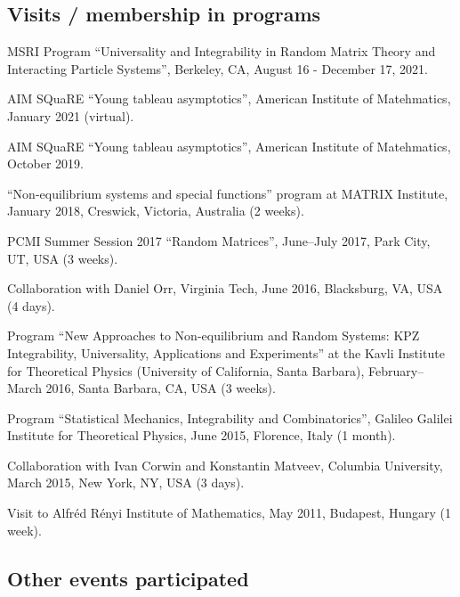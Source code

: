 \documentclass[letterpaper,11pt]{article}
\begin{document}
\subsection*{Visits / membership in programs}

\begin{etaremune}
	\item 
	MSRI Program ``Universality and Integrability in Random Matrix Theory and Interacting Particle Systems'', Berkeley, CA, August 16 - December 17, 2021.
	\item 
	AIM SQuaRE ``Young tableau asymptotics'', American Institute of Matehmatics, 
	January 2021 (virtual).
	\item 
	AIM SQuaRE ``Young tableau asymptotics'', American Institute of Matehmatics, 
	October 2019.
	\item 
		``Non-equilibrium systems and special functions'' program at MATRIX Institute,
		January 2018, 
		Creswick, Victoria, Australia (2 weeks).
	\item
	      PCMI Summer Session 2017 ``Random Matrices'', June--July 2017,
	      Park City, UT, USA (3 weeks).
	\item
	      Collaboration with Daniel Orr, Virginia Tech, June 2016,
	      Blacksburg, VA, USA (4 days).
	\item
	      Program ``New Approaches to Non-equilibrium and Random Systems:
	      KPZ Integrability, Universality, Applications and Experiments'' at the Kavli
	      Institute for Theoretical Physics (University of California, Santa Barbara),
	      February--March 2016, Santa Barbara, CA, USA (3 weeks).
	\item
	      Program ``Statistical Mechanics, Integrability and
	      Combinatorics'', Galileo Galilei Institute for Theoretical Physics, June 2015,
	      Florence, Italy (1 month).
	\item
	      Collaboration with Ivan Corwin and Konstantin Matveev, Columbia
	      University, March 2015, New York, NY, USA (3 days).
	\item
	      Visit to Alfr\'ed R\'enyi Institute of Mathematics, May 2011,
	      Budapest, Hungary (1 week).
\end{etaremune}

\subsection*{Other events participated}
\end{document}
